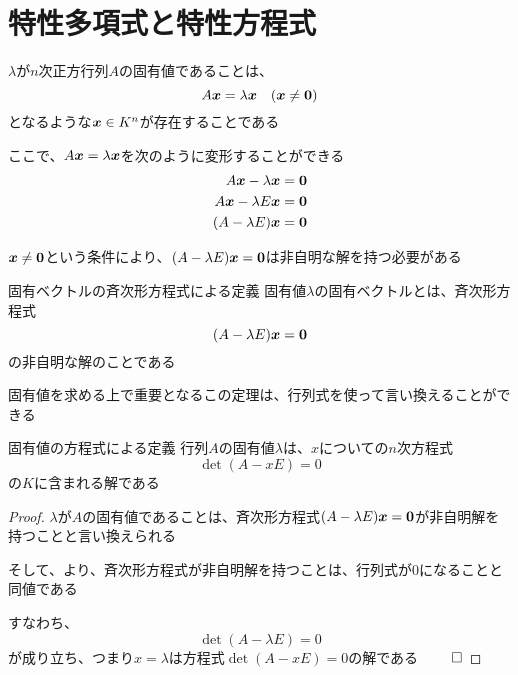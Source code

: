 \documentclass[../../../topic_linear-algebra]{subfiles}
\begin{document}
\sectionline
\section{特性多項式と特性方程式}

$\lambda$が$n$次正方行列$A$の固有値であることは、
\begin{equation*}
  A\vb*{x} = \lambda \vb*{x} \quad (\vb*{x} \neq \vb*{0})
\end{equation*}
となるような$\vb*{x} \in K^n$が存在することである

\br

ここで、$A\vb*{x} = \lambda \vb*{x}$を次のように変形することができる
\begin{align*}
  A\vb*{x} - \lambda \vb*{x}  & = \vb*{0} \\
  A\vb*{x} - \lambda E\vb*{x} & = \vb*{0} \\
  (A - \lambda E)\vb*{x}      & = \vb*{0}
\end{align*}

$\vb*{x} \neq \vb*{0}$という条件により、$(A - \lambda E)\vb*{x} = \vb*{0}$は非自明な解を持つ必要がある

\begin{theorem*}{固有ベクトルの斉次形方程式による定義}
  固有値$\lambda$の固有ベクトルとは、斉次形方程式
  \begin{equation*}
    (A - \lambda E)\vb*{x} = \vb*{0}
  \end{equation*}
  の非自明な解のことである
\end{theorem*}

固有値を求める上で重要となるこの定理は、行列式を使って言い換えることができる

\begin{theorem*}{固有値の方程式による定義}
  行列$A$の固有値$\lambda$は、$x$についての$n$次方程式
  \begin{equation*}
    \det(A - x E) = 0
  \end{equation*}
  の$K$に含まれる解である
\end{theorem*}

\begin{proof}
  $\lambda$が$A$の固有値であることは、斉次形方程式$(A - \lambda E)\vb*{x} = \vb*{0}$が非自明解を持つことと言い換えられる

  そして、より、斉次形方程式が非自明解を持つことは、行列式が0になることと同値である

  すなわち、
  \begin{equation*}
    \det(A - \lambda E) = 0
  \end{equation*}
  が成り立ち、つまり$x = \lambda$は方程式$\det(A - xE) = 0$の解である $\qed$
\end{proof}
\end{document}
